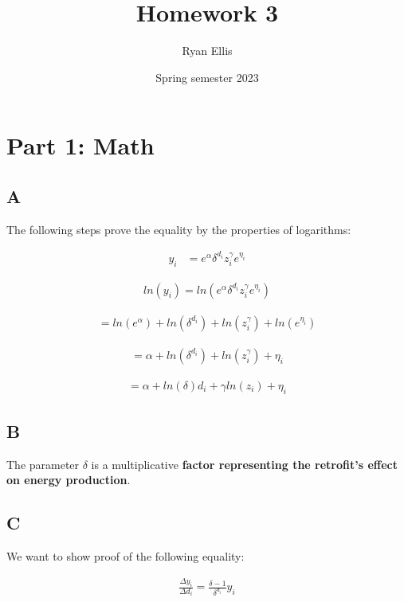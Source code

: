 \documentclass{article}
\title{Homework 3}
\author{Ryan Ellis}
\date{Spring semester 2023}
\begin{document}
  
\maketitle

\section{Part 1: Math}

\subsection{A}
The following steps prove the equality by the properties of logarithms:

\begin{align}
    y_i &= e^\alpha \delta^{d_i} z^\gamma_i e^{\eta_i}
\end{align}

\begin{align}
    ln{(y_i)} = ln{(e^\alpha \delta^{d_i} z^\gamma_i e^{\eta_i})}
\end{align}

\begin{align}
    = ln{(e^\alpha)} + ln{(\delta^{d_i})} + ln{(z^\gamma_i)} + ln{(e^{\eta_i})}
\end{align}

\begin{align}
    = \alpha + ln{(\delta^{d_i})} + ln{(z^\gamma_i)} + \eta_i
\end{align}

\begin{align}
    = \alpha + ln{(\delta)}d_i + \gamma ln{(z_i)} + \eta_i
\end{align}

\subsection{B}

The parameter $\delta$ is a multiplicative \textbf{factor representing the retrofit's effect on energy production}.

\subsection{C}

We want to show proof of the following equality:

\begin{align}
    \frac{\Delta y_i}{\Delta {d_i}}  = \frac{\delta - 1}{\delta ^ {d_i}} y_i
\end{align}
\end{document}
